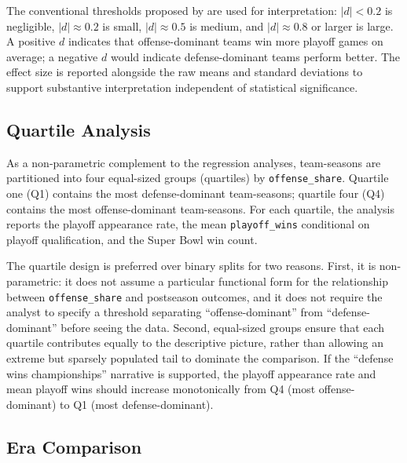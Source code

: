 The conventional thresholds proposed by \textcite{cohen1988statisticalpower}
are used for interpretation: $|d| < 0.2$ is negligible, $|d| \approx 0.2$
is small, $|d| \approx 0.5$ is medium, and $|d| \approx 0.8$ or larger is
large. A positive $d$ indicates that offense-dominant teams win more playoff
games on average; a negative $d$ would indicate defense-dominant teams
perform better. The effect size
is reported alongside the raw means and standard deviations to support
substantive interpretation independent of statistical significance.

\subsection{Quartile Analysis}
\label{sec:quartile-analysis}

As a non-parametric complement to the regression analyses, team-seasons are
partitioned into four equal-sized groups (quartiles) by \texttt{offense\_share}.
Quartile one (Q1) contains the most defense-dominant team-seasons; quartile
four (Q4) contains the most offense-dominant team-seasons. For each quartile,
the analysis reports the playoff appearance rate, the mean \texttt{playoff\_wins}
conditional on playoff qualification, and the Super Bowl win count.

The quartile design is preferred over binary splits for two reasons. First, it
is non-parametric: it does not assume a particular functional form for the
relationship between \texttt{offense\_share} and postseason outcomes, and it
does not require the analyst to specify a threshold separating
``offense-dominant'' from ``defense-dominant'' before seeing the data. Second,
equal-sized groups ensure that each quartile contributes equally to the
descriptive picture, rather than allowing an extreme but sparsely populated
tail to dominate the comparison. If the ``defense wins championships'' narrative
is supported, the playoff appearance rate and mean playoff wins should increase
monotonically from Q4 (most offense-dominant) to Q1 (most defense-dominant).

\subsection{Era Comparison}
\label{sec:era-comparison}

